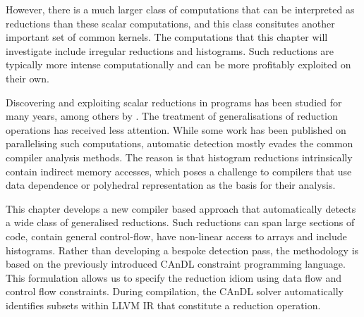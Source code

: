     However, there is a much larger class of computations that can be
    interpreted as reductions than these scalar computations, and this class
    consitutes another important set of common kernels.
    The computations that this chapter will investigate include irregular
    reductions and histograms.
    Such reductions are typically more intense computationally and can be
    more profitably exploited on their own.

    Discovering and exploiting scalar reductions in programs has been
    studied for many years, among others by \citet{pottenger1995idiom}.
    The treatment of generalisations of reduction operations has received less
    attention.
    While some work has been published on parallelising such computations,
    automatic detection mostly evades the common compiler analysis methods.
    The reason is that histogram reductions intrinsically contain indirect
    memory accesses, which poses a challenge to compilers that use
    data dependence \citep{kuck1981dependence} or polyhedral
    representation \citep{benabderrahmane2010polyhedral} as the basis for
    their analysis.

%
    This chapter develops a new compiler based approach that automatically
    detects a wide class of generalised reductions.
    Such reductions can span large sections of code, contain general
    control-flow, have non-linear access to arrays and include histograms.
    Rather than developing a bespoke detection pass, the methodology is based on
    the previously introduced CAnDL constraint programming language.
    This formulation allows us to specify the reduction idiom using data flow
    and control flow constraints.
    During compilation, the CAnDL solver automatically identifies
    subsets within LLVM IR that constitute a reduction operation.

